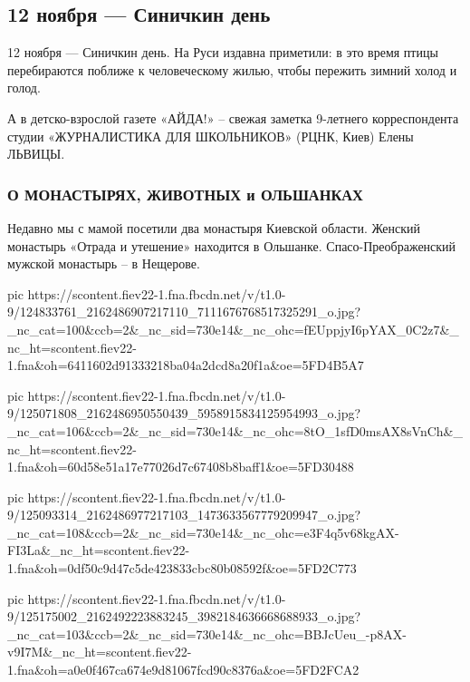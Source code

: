  
 
 

\subsection{12 ноября --- Синичкин день}
\label{sec:12_11_2020.fb.roman_barashev.1.sinichkin_den}


12 ноября --- Синичкин день. На Руси издавна приметили: в это время птицы
перебираются поближе к человеческому жилью, чтобы пережить зимний холод и
голод.

А в детско-взрослой газете «АЙДА!» -- свежая заметка 9-летнего корреспондента
студии «ЖУРНАЛИСТИКА ДЛЯ ШКОЛЬНИКОВ» (РЦНК, Киев) Елены ЛЬВИЦЫ.

\subsubsection{О МОНАСТЫРЯХ, ЖИВОТНЫХ и ОЛЬШАНКАХ}

Недавно мы с мамой посетили два монастыря Киевской области. Женский монастырь
«Отрада и утешение» находится в Ольшанке. Спасо-Преображенский мужской
монастырь -- в Нещерове.

\ifcmt
pic https://scontent.fiev22-1.fna.fbcdn.net/v/t1.0-9/124833761_2162486907217110_7111676768517325291_o.jpg?_nc_cat=100&ccb=2&_nc_sid=730e14&_nc_ohc=fEUppjyI6pYAX_0C2z7&_nc_ht=scontent.fiev22-1.fna&oh=6411602d91333218ba04a2dcd8a20f1a&oe=5FD4B5A7

pic https://scontent.fiev22-1.fna.fbcdn.net/v/t1.0-9/125071808_2162486950550439_5958915834125954993_o.jpg?_nc_cat=106&ccb=2&_nc_sid=730e14&_nc_ohc=8tO_1sfD0msAX8sVnCh&_nc_ht=scontent.fiev22-1.fna&oh=60d58e51a17e77026d7c67408b8baff1&oe=5FD30488

pic https://scontent.fiev22-1.fna.fbcdn.net/v/t1.0-9/125093314_2162486977217103_1473633567779209947_o.jpg?_nc_cat=108&ccb=2&_nc_sid=730e14&_nc_ohc=e3F4q5v68kgAX-FI3La&_nc_ht=scontent.fiev22-1.fna&oh=0df50c9d47c5de423833cbc80b08592f&oe=5FD2C773

pic https://scontent.fiev22-1.fna.fbcdn.net/v/t1.0-9/125175002_2162492223883245_3982184636668688933_o.jpg?_nc_cat=103&ccb=2&_nc_sid=730e14&_nc_ohc=BBJcUeu_-p8AX-v9I7M&_nc_ht=scontent.fiev22-1.fna&oh=a0e0f467ca674e9d81067fcd90c8376a&oe=5FD2FCA2
\fi

